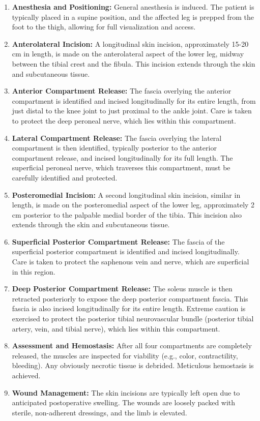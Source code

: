 \begin{enumerate}
  \item \textbf{Anesthesia and Positioning:} General anesthesia is induced. The patient is typically placed in a supine position, and the affected leg is prepped from the foot to the thigh, allowing for full visualization and access.
  \item \textbf{Anterolateral Incision:} A longitudinal skin incision, approximately 15-20 cm in length, is made on the anterolateral aspect of the lower leg, midway between the tibial crest and the fibula. This incision extends through the skin and subcutaneous tissue.
  \item \textbf{Anterior Compartment Release:} The fascia overlying the anterior compartment is identified and incised longitudinally for its entire length, from just distal to the knee joint to just proximal to the ankle joint. Care is taken to protect the deep peroneal nerve, which lies within this compartment.
  \item \textbf{Lateral Compartment Release:} The fascia overlying the lateral compartment is then identified, typically posterior to the anterior compartment release, and incised longitudinally for its full length. The superficial peroneal nerve, which traverses this compartment, must be carefully identified and protected.
  \item \textbf{Posteromedial Incision:} A second longitudinal skin incision, similar in length, is made on the posteromedial aspect of the lower leg, approximately 2 cm posterior to the palpable medial border of the tibia. This incision also extends through the skin and subcutaneous tissue.
  \item \textbf{Superficial Posterior Compartment Release:} The fascia of the superficial posterior compartment is identified and incised longitudinally. Care is taken to protect the saphenous vein and nerve, which are superficial in this region.
  \item \textbf{Deep Posterior Compartment Release:} The soleus muscle is then retracted posteriorly to expose the deep posterior compartment fascia. This fascia is also incised longitudinally for its entire length. Extreme caution is exercised to protect the posterior tibial neurovascular bundle (posterior tibial artery, vein, and tibial nerve), which lies within this compartment.
  \item \textbf{Assessment and Hemostasis:} After all four compartments are completely released, the muscles are inspected for viability (e.g., color, contractility, bleeding). Any obviously necrotic tissue is debrided. Meticulous hemostasis is achieved.
  \item \textbf{Wound Management:} The skin incisions are typically left open due to anticipated postoperative swelling. The wounds are loosely packed with sterile, non-adherent dressings, and the limb is elevated.
\end{enumerate}

